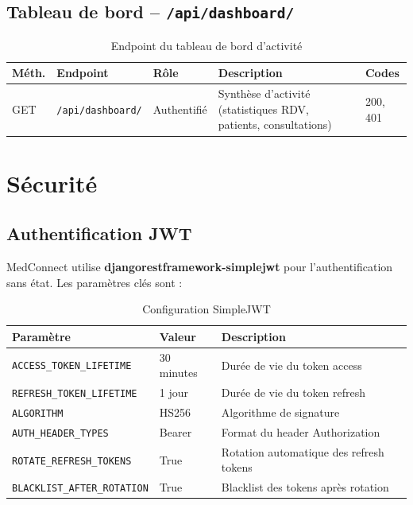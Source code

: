 \documentclass[12pt,a4paper]{report}
\begin{document}
\section{Tableau de bord -- \texttt{/api/dashboard/}}

\begin{table}[H]
\centering
\caption{Endpoint du tableau de bord d'activité}
\renewcommand{\arraystretch}{1.4}
\begin{tabular}{|p{1.5cm}|p{4.5cm}|p{2.5cm}|p{4.5cm}|p{1.5cm}|}
  \hline
  \rowcolor{medaccent}
  \textbf{Méth.} & \textbf{Endpoint} & \textbf{Rôle} & \textbf{Description} & \textbf{Codes} \\
  \hline
  GET & \texttt{/api/dashboard/} & Authentifié & Synthèse d'activité (statistiques RDV, patients, consultations) & 200, 401 \\
  \hline
\end{tabular}
\end{table}

\chapter{Sécurité}

\section{Authentification JWT}

MedConnect utilise \textbf{djangorestframework-simplejwt} pour l'authentification sans état. Les paramètres clés sont :

\begin{table}[H]
\centering
\caption{Configuration SimpleJWT}
\renewcommand{\arraystretch}{1.4}
\begin{tabular}{|p{5cm}|p{4cm}|p{5cm}|}
  \hline
  \rowcolor{medaccent}
  \textbf{Paramètre} & \textbf{Valeur} & \textbf{Description} \\
  \hline
  \texttt{ACCESS\_TOKEN\_LIFETIME} & 30 minutes & Durée de vie du token access \\
  \hline
  \texttt{REFRESH\_TOKEN\_LIFETIME} & 1 jour & Durée de vie du token refresh \\
  \hline
  \texttt{ALGORITHM} & HS256 & Algorithme de signature \\
  \hline
  \texttt{AUTH\_HEADER\_TYPES} & Bearer & Format du header Authorization \\
  \hline
  \texttt{ROTATE\_REFRESH\_TOKENS} & True & Rotation automatique des refresh tokens \\
  \hline
  \texttt{BLACKLIST\_AFTER\_ROTATION} & True & Blacklist des tokens après rotation \\
  \hline
\end{tabular}
\end{table}
\end{document}
